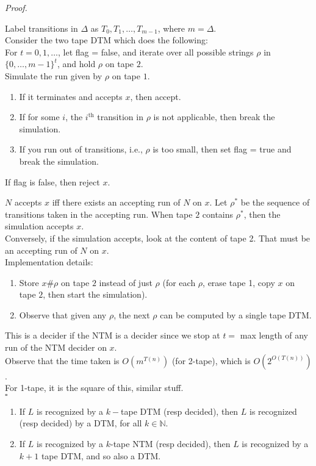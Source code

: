 \documentclass[a4paper]{article}
\newenvironment{proof}{\begin{breakbox}\textit{Proof.}}{\hfill$\square$\end{breakbox}}
\newcommand{\nl}{\vspace{0.2cm}\\}
\newcommand{\mb}{\mathbb}
\begin{document}
\begin{proof}

    Label transitions in $\Delta$ as $T_0, T_1, \ldots, T_{m-1}$, where $m = \Delta$.\nl
    Consider the two tape DTM which does the following:\nl
    For $t = 0, 1, \ldots$, let flag = false, and iterate over all possible strings $\rho$ in $\{0, \ldots, m - 1\}^t$, and hold $\rho$ on tape $2$.\nl
    Simulate the run given by $\rho$ on tape $1$.
    \begin{enumerate}
        \item If it terminates and accepts $x$, then accept.
        \item If for some $i$, the $i^\mathrm{th}$ transition in $\rho$ is not applicable, then break the simulation.
        \item If you run out of transitions, i.e., $\rho$ is too small, then set flag = true and break the simulation.
    \end{enumerate}
    If flag is false, then reject $x$.


    $N$ accepts $x$ iff there exists an accepting run of $N$ on $x$. Let $\rho^*$ be the sequence of transitions taken in the accepting run. When tape $2$ contains $\rho^*$, then the simulation
    accepts $x$.\nl
    Conversely, if the simulation accepts, look at the content of tape 2. That must be an accepting run of $N$ on $x$.\nl
    Implementation details:
    \begin{enumerate}
        \item Store $x\#\rho$ on tape $2$ instead of just $\rho$ (for each $\rho$, erase tape 1, copy $x$ on tape $2$, then start the simulation).
        \item Observe that given any $\rho$, the next $\rho$ can be computed by a single tape DTM.
    \end{enumerate}

    This is a decider if the NTM is a decider since we stop at $t = $ max length of any run of the NTM decider on $x$.\nl

    Observe that the time taken is $O(m^{T(n)})$ (for 2-tape), which is $O(2^{O(T(n))})$.\nl

    For 1-tape, it is the square of this, similar stuff.\nl

    \end{proof}
\begin{note}
        \begin{enumerate}
            \item If $L$ is recognized by a $k-$tape DTM (resp decided), then $L$ is recognized (resp decided) by a DTM, for all $k \in \mb{N}$.
            \item If $L$ is recognized by a $k$-tape NTM (resp decided), then $L$ is recognized by a $k + 1$ tape DTM, and so also a DTM.
        \end{enumerate}
\end{note}
\end{document}
